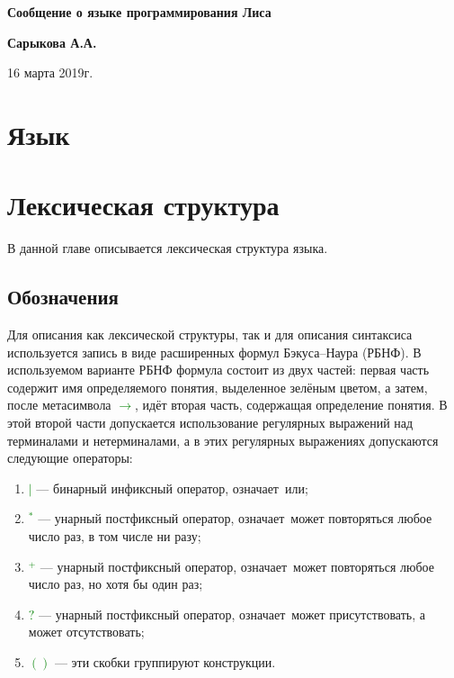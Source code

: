 \documentclass[10pt]{report}
\begin{document}
\begin{titlepage}
\begin{center}
\vspace*{8cm}

{\bf\Huge
Сообщение о языке программирования Лиса

} \vspace{2.5cm}


\LARGE
\textbf{Сарыкова А.А.}

 \vspace{2.5cm}

{16 марта 2019г.}

\end{center}
\end{titlepage}
\tableofcontents

\newpage

\chapter{Язык}
    \chapter{Лексическая структура}
В данной главе описывается лексическая структура языка.
\section{Обозначения}	
Для описания как лексической структуры, так и для описания синтаксиса используется запись в виде расширенных формул Бэкуса--Наура (РБНФ). В используемом варианте РБНФ  формула состоит из двух частей: первая часть содержит имя определяемого понятия, выделенное зелёным цветом, а затем, после метасимвола \textcolor{Green}{$\to$}, идёт вторая часть, содержащая определение понятия. В этой второй части допускается использование регулярных выражений над терминалами и нетерминалами, а в этих регулярных выражениях допускаются следующие операторы: 
\begin{enumerate}
\item \textcolor{Green}{$|$} --- бинарный инфиксный оператор, означает\ \glqq или\grqq;
\item \textcolor{Green}{$^*$} --- унарный постфиксный оператор, означает\ \glqq может повторяться любое число раз, в том числе ни разу\grqq;
\item \textcolor{Green}{$^+$} --- унарный постфиксный оператор, означает\ \glqq может повторяться любое число раз, но хотя бы один раз\grqq;
\item \textcolor{Green}{$?$} --- унарный постфиксный оператор, означает\ \glqq может присутствовать, а может отсутствовать\grqq;
\item\textcolor{Green}{$( )$} --- эти скобки группируют конструкции.
\end{enumerate}
\end{document}
